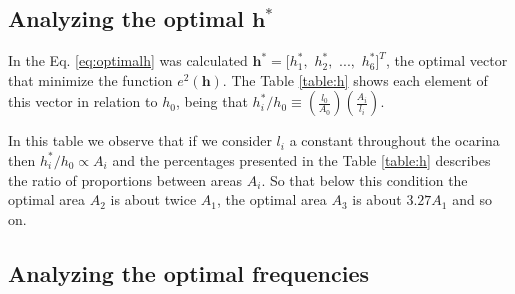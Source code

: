 \documentclass[11pt,twocolumn]{article}
\begin{document}
\subsection{Analyzing the optimal $\mathbf{h^*}$}
In the Eq. \ref{eq:optimalh} was calculated $\mathbf{h^*}=[h_1^*,$ $h_2^*,$ $...,$ $h_6^*]^{T}$, 
the optimal vector that minimize the function $e^2(\mathbf{h})$. 
The Table \ref{table:h} shows each element of this vector in relation to $h_0$, 
being that $ h_{i}^*/h_{0} \equiv  \left( \frac{l_0}{A_0}\right) \left( \frac{A_{i}}{l_{i}}    \right)$.
\begin{table}[h]
\center
{}
\caption{Percentage ratio between $h_{i}^*$ and $h_{0}$.}
\label{table:h}
\end{table}

In this table we observe that if 
we consider $l_{i}$ a constant throughout the ocarina 
then $h_{i}^*/h_{0} \propto A_{i}$ and 
the percentages presented in the Table \ref{table:h} describes the ratio of proportions between areas $A_i$.
So that below this condition 
the optimal area $A_{2}$ is about twice $A_{1}$, 
the optimal area $A_{3}$ is about $3.27 A_{1}$   
and so on.




\subsection{Analyzing the optimal frequencies}
\end{document}
